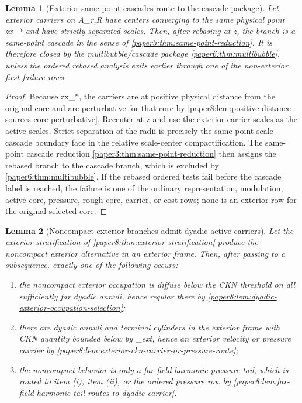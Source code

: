 \documentclass[11pt]{amsart}
\def\({}%
\def\){}%
\theoremstyle{plain}
\newtheorem{lemma}[lemma]{Lemma}
\theoremstyle{definition}
\theoremstyle{remark}
\begin{document}
\begin{lemma}[Exterior same-point cascades route to the cascade package]
\label{paper8:lem:exterior-same-point-cascade-routing}
Let exterior carriers on \(A_{r,R}\) have centers converging to the same
physical point \(z\ne x_*\) and have strictly separated scales.  Then, after
rebasing at \(z\), the branch is a same-point cascade in the sense of
\cref{paper3:thm:same-point-reduction}.  It is therefore closed by the
multibubble/cascade package \cref{paper6:thm:multibubble}, unless the ordered
rebased analysis exits earlier through one of the non-exterior first-failure
rows.
\end{lemma}

\begin{proof}
Because \(z\ne x_*\), the carriers are at positive physical distance from the
original core and are perturbative for that core by
\cref{paper8:lem:positive-distance-sources-core-perturbative}.  Recenter at
\(z\) and use the exterior carrier scales as the active scales.  Strict
separation of the radii is precisely the same-point scale-cascade boundary face
in the relative scale-center compactification.  The same-point cascade
reduction \cref{paper3:thm:same-point-reduction} then assigns the rebased
branch to the cascade branch, which is excluded by
\cref{paper6:thm:multibubble}.  If the rebased ordered tests fail before the
cascade label is reached, the failure is one of the ordinary representation,
modulation, active-core, pressure, rough-core, carrier, or cost rows; none is
an exterior row for the original selected core.
\end{proof}

\begin{lemma}[Noncompact exterior branches admit dyadic active carriers]
\label{paper8:lem:noncompact-exterior-dyadic-selection}
Let the exterior stratification of \cref{paper8:thm:exterior-stratification}
produce the noncompact exterior alternative in an exterior frame.  Then, after
passing to a subsequence, exactly one of the following occurs:
\begin{enumerate}[label=\textup{(\roman*)}]
\item the noncompact exterior occupation is diffuse below the CKN threshold on
all sufficiently far dyadic annuli, hence regular there by
\cref{paper8:lem:dyadic-exterior-occupation-selection};
\item there are dyadic annuli and terminal cylinders in the exterior frame with
CKN quantity bounded below by \(\varepsilon_{\rm ext}\), hence an exterior
velocity or pressure carrier by
\cref{paper8:lem:exterior-ckn-carrier-or-pressure-route};
\item the noncompact behavior is only a far-field harmonic pressure tail, which
is routed to item \textup{(i)}, item \textup{(ii)}, or the ordered pressure row
by \cref{paper8:lem:far-field-harmonic-tail-routes-to-dyadic-carrier}.
\end{enumerate}
\end{lemma}
\end{document}

